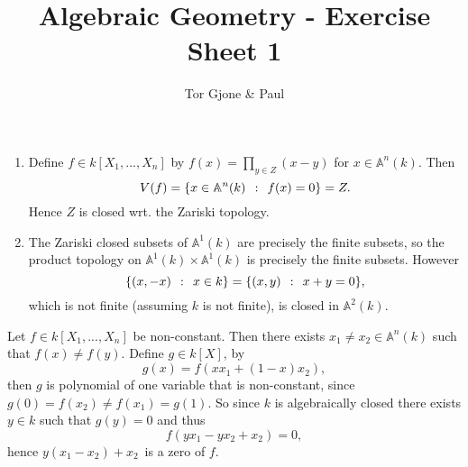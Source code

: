 \documentclass[a4paper,11pt,english]{article}
\title{\textbf{Algebraic Geometry} - Exercise Sheet 1}
\author{Tor Gjone \& Paul}
\def\A{\mathbb{A}}
\begin{document}
\mmaketitle


\begin{solution}[1] %
\begin{enumerate}
\item Define $f\in k[X_1,...,X_n]$ by $f(x) = \prod_{y \in Z} (x - y)$ for $x
\in \A^n(k)$. Then 
\[ V(f) = \{ x \in \A^n(k) \q: f(x) =0 \} = Z. \] Hence $Z$ is
closed wrt. the Zariski topology.
\item
The Zariski closed subsets of $\A^1(k)$ are precisely the finite subsets,
so the product topology on $\A^1(k) \times \A^1(k)$ is precisely the
finite subsets. However 
\[ \{ (x,-x) \:\::\:\: x\in k \} = \{ (x,y) \:\::\:\: x+y = 0 \}, \]
which is not finite (assuming $k$ is not finite), is closed in $\A^2(k)$. 
\end{enumerate}
\end{solution} 

\begin{solution}[2]
Let $f \in k[X_1,...,X_{n}]$ be non-constant. Then there exists $x_1 \ne x_2 \in
\A^n(k)$ such that $f(x) \ne f(y)$. 
Define $g \in k[X]$, by 
\[ g(x) = f(x x_1 + (1-x) x_2), \]
then $g$ is polynomial of one variable that is non-constant, since $g(0) =
f(x_2) \ne f(x_1) = g(1)$. 
So since $k$ is algebraically closed there exists $y \in k$ such that $g(y) =
0$ and thus 
\[ f(y x_1 - y x_2 + x_2) = 0, \]
hence $y (x_1 - x_2) + x_2$ is a zero of $f$.
\end{solution}
\end{document}

